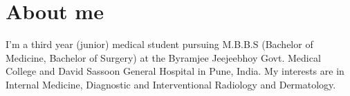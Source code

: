 \section{About me}
    I’m a third year (junior) medical student pursuing M.B.B.S (Bachelor of Medicine, Bachelor of Surgery)
    at the Byramjee Jeejeebhoy Govt. Medical College and David Sassoon General Hospital in Pune, India.
    My interests are in Internal Medicine, Diagnostic and Interventional Radiology and Dermatology.


